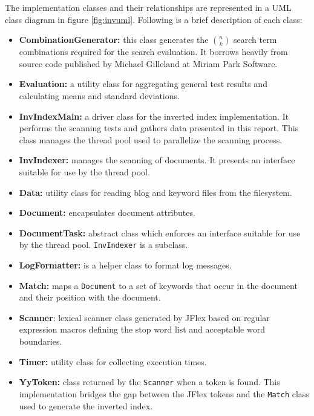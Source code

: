 \documentclass[10pt]{report}
\begin{document}
The implementation classes and their relationships are represented in a UML
class diagram in figure \ref{fig:invuml}. Following is a brief
description of each class:

\begin{itemize}
\item \textbf{CombinationGenerator:} this class generates the ${n
  \choose k}$ search term combinations required for the search
  evaluation. It borrows heavily from source code published by Michael
  Gilleland at Miriam Park Software.

\item \textbf{Evaluation:} a utility class for aggregating general
  test results and calculating means and standard deviations.

\item \textbf{InvIndexMain:} a driver class for the inverted index
  implementation. It performs the scanning tests and gathers data
  presented in this report. This class manages the thread pool used to
  parallelize the scanning process.

\item \textbf{InvIndexer:} manages the scanning of documents. It
  presents an interface suitable for use by the thread pool.

\item \textbf{Data:} utility class for reading blog and keyword files
  from the filesystem.

\item \textbf{Document:} encapsulates document attributes.

\item \textbf{DocumentTask:} abstract class which enforces an
  interface suitable for use by the thread pool. \texttt{InvIndexer}
  is a subclass.

\item \textbf{LogFormatter:} is a helper class to format log messages.

\item \textbf{Match:} maps a \texttt{Document} to a set of keywords
  that occur in the document and their position with the document.

\item \textbf{Scanner}: lexical scanner class generated by JFlex based
  on regular expression macros defining the stop word list and
  acceptable word boundaries.

\item \textbf{Timer:} utility class for collecting execution times.

\item \textbf{YyToken:} class returned by the \texttt{Scanner} when a
  token is found. This implementation bridges the gap between the JFlex
  tokens and the \texttt{Match} class used to generate the inverted
  index.
\end{itemize}
\end{document}
